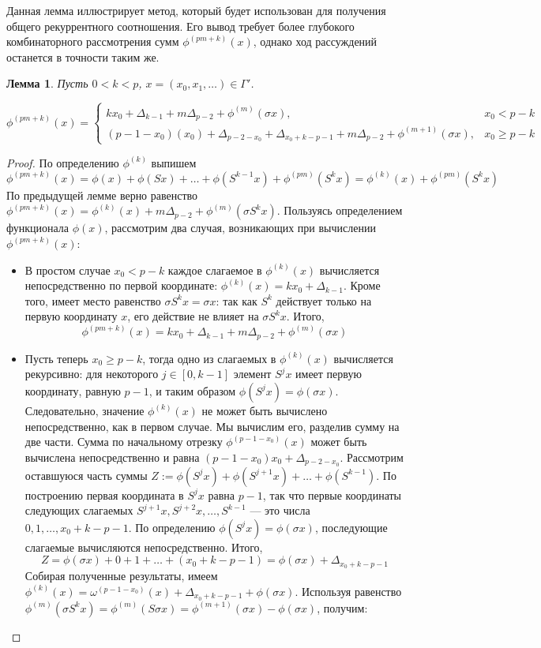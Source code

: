 \documentclass[14pt, a4paper, russian]{report}
\newtheorem{lemma}{\indent Лемма}
\begin{document}
Данная лемма иллюстрирует метод, который будет использован для получения общего рекуррентного соотношения. Его вывод требует более глубокого комбинаторного рассмотрения сумм $\phi^{(pm+k)}(x)$, однако ход рассуждений останется в точности таким же.
\begin{lemma} \label{phiLemma}
Пусть $0 < k < p$,  $x=(x_0,x_1,\ldots) \in \Gamma'$.

$\phi^{(pm+k)}(x)= 
\begin{cases}
k x_0 + \Delta_{k-1} + m\Delta_{p-2} + \phi^{(m)}(\sigma x), & x_0 < p-k\\
(p-1-x_0)(x_0) + \Delta_{p-2-x_0} + \Delta_{x_0+k-p-1}+m\Delta_{p-2}+\phi^{(m+1)}(\sigma x), & x_0 \ge p-k
\end{cases}$
\end{lemma}
\begin{proof}
По определению $\phi^(k)$ выпишем $$\phi^{(pm+k)}(x) = \phi(x) + \phi(Sx) + \ldots + \phi(S^{k-1}x) + \phi^{(pm)}(S^k x)= \phi^{(k)}(x) + \phi^{(pm)}(S^k x)$$
По предыдущей лемме верно равенство $\phi^{(pm+k)}(x) =  \phi^{(k)}(x) + m\Delta_{p-2} + \phi^{(m)}(\sigma S^k x)$.
Пользуясь определением функционала $\phi(x)$, рассмотрим два случая, возникающих при вычислении $\phi^{(pm+k)}(x)$:
\begin{itemize}
\item В простом случае $x_0 < p-k $ каждое слагаемое в $\phi^{(k)}(x)$ вычисляется непосредственно по первой координате: $\phi^{(k)}(x) = k x_0 + \Delta_{k-1}$. Кроме того, имеет место равенство $\sigma S^k x = \sigma x$: так как $S^k$ действует только на первую координату $x$, его действие не влияет на $\sigma S^k x$. Итого, $$\phi^{(pm+k)}(x)=k x_0 + \Delta_{k-1}+m\Delta_{p-2}+\phi^{(m)}(\sigma x)$$
\item Пусть теперь $x_0 \ge p-k $, тогда одно из слагаемых в $\phi^{(k)}(x)$ вычисляется рекурсивно: для некоторого $j \in [0,k-1]$ элемент $S^j x$ имеет первую координату, равную $p-1$, и таким образом $\phi(S^j x) = \phi(\sigma x)$. Следовательно, значение $\phi^{(k)}(x)$ не может быть вычислено непосредственно, как в первом случае. Мы вычислим его, разделив сумму на две части. Сумма по начальному отрезку $\phi^{(p-1-x_0)}(x)$ может быть вычислена непосредственно и равна $(p-1-x_0)x_0 + \Delta_{p-2-x_0}$. Рассмотрим оставшуюся часть суммы $Z := \phi(S^j x) + \phi(S^{j+1}x) + \ldots + \phi(S^{k-1})$. По построению первая координата в $S^j x$ равна $p-1$, так что первые координаты следующих слагаемых $S^{j+1}x, S^{j+2}x, \ldots, S^{k-1}$ --- это числа $0,1,\ldots, x_0+k-p-1$. По определению $\phi(S^j x) = \phi(\sigma x)$, последующие слагаемые вычисляются непосредственно. Итого, $$Z = \phi(\sigma x) + 0 + 1 + \ldots + (x_0+k-p-1) =  \phi(\sigma x) + \Delta_{x_0+k-p-1}$$ Собирая полученные результаты, имеем $\phi^{(k)}(x)=\omega^{(p-1-x_0)}(x) + \Delta_{x_0+k-p-1}+\phi(\sigma x)$. Используя равенство $\phi^{(m)}(\sigma S^k x) = \phi^{(m)}(S\sigma x)  = \phi^{(m+1)}(\sigma x) - \phi(\sigma x)$, получим: 

\end{itemize}
\end{proof}
\end{document}
